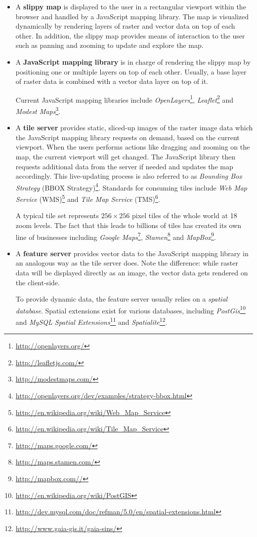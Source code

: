\begin{itemize}

\item A \textbf{slippy map} is displayed to the user in a rectangular viewport within the browser and handled by a JavaScript mapping library. The map is visualized dynamically by rendering layers of raster and vector data on top of each other. In addition, the slippy map provides means of interaction to the user such as panning and zooming to update and explore the map. 

\item A \textbf{JavaScript mapping library} is in charge of rendering the slippy map by positioning one or multiple layers on top of each other. Usually, a base layer of raster data is combined with a vector data layer on top of it.

Current JavaScript mapping libraries include \textit{OpenLayers}\footnote{\url{http://openlayers.org/}}, \textit{Leaflet}\footnote{\url{http://leafletjs.com/}} and \textit{Modest Maps}\footnote{\url{http://modestmaps.com/}}.

\item A \textbf{tile server} provides static, sliced-up images of the raster image data which the JavaScript mapping library requests on demand, based on the current viewport. When the users performs actions like dragging and zooming on the map, the current viewport will get changed. The JavaScript library then requests additional data from the server if needed and updates the map accordingly. This live-updating process is also referred to as \textit{Bounding Box Strategy} (BBOX Strategy)\footnote{\url{http://openlayers.org/dev/examples/strategy-bbox.html}}. Standards for consuming tiles include \textit{Web Map Service} (WMS)\footnote{\url{http://en.wikipedia.org/wiki/Web_Map_Service}} and \textit{Tile Map Service} (TMS)\footnote{\url{http://en.wikipedia.org/wiki/Tile_Map_Service}}.

A typical tile set represents $256 \times 256$ pixel tiles of the whole world at 18 zoom levels. The fact that this leads to billions of tiles has created its own line of businesses including \textit{Google Maps}\footnote{\url{http://maps.google.com/}}, \textit{Stamen}\footnote{\url{http://maps.stamen.com/}} and \textit{MapBox}\footnote{\url{http://mapbox.com//}}.

\item A \textbf{feature server} provides vector data to the JavaScript mapping library in an analogous way as the tile server does. Note the difference: while raster data will be displayed directly as an image, the vector data gets rendered on the client-side.

To provide dynamic data, the feature server usually relies on a \textit{spatial database}. Spatial extensions exist for various databases, including \textit{PostGis}\footnote{\url{http://en.wikipedia.org/wiki/PostGIS}} and \textit{MySQL Spatial Extensions}\footnote{\url{http://dev.mysql.com/doc/refman/5.0/en/spatial-extensions.html}} and \textit{Spatialite}\footnote{\url{http://www.gaia-gis.it/gaia-sins/}}.

\end{itemize}










